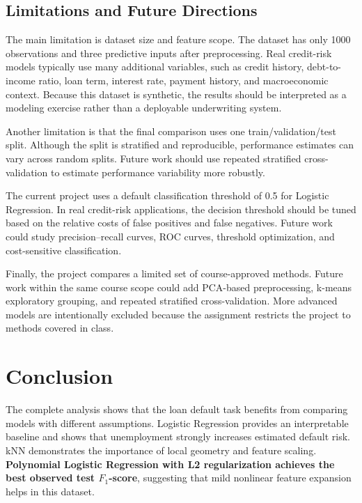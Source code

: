\documentclass[12pt]{article}
\begin{document}
\subsection{Limitations and Future Directions}

The main limitation is dataset size and feature scope. The dataset has only 1000 observations and three predictive inputs after preprocessing. Real credit-risk models typically use many additional variables, such as credit history, debt-to-income ratio, loan term, interest rate, payment history, and macroeconomic context. Because this dataset is synthetic, the results should be interpreted as a modeling exercise rather than a deployable underwriting system.

Another limitation is that the final comparison uses one train/validation/test split. Although the split is stratified and reproducible, performance estimates can vary across random splits. Future work should use repeated stratified cross-validation to estimate performance variability more robustly.

The current project uses a default classification threshold of 0.5 for Logistic Regression. In real credit-risk applications, the decision threshold should be tuned based on the relative costs of false positives and false negatives. Future work could study precision--recall curves, ROC curves, threshold optimization, and cost-sensitive classification.

Finally, the project compares a limited set of course-approved methods. Future work within the same course scope could add PCA-based preprocessing, k-means exploratory grouping, and repeated stratified cross-validation. More advanced models are intentionally excluded because the assignment restricts the project to methods covered in class.

\section{Conclusion}

The complete analysis shows that the loan default task benefits from comparing models with different assumptions. Logistic Regression provides an interpretable baseline and shows that unemployment strongly increases estimated default risk. kNN demonstrates the importance of local geometry and feature scaling. \textbf{Polynomial Logistic Regression with L2 regularization achieves the best observed test $F_1$-score}, suggesting that mild nonlinear feature expansion helps in this dataset.
\end{document}
